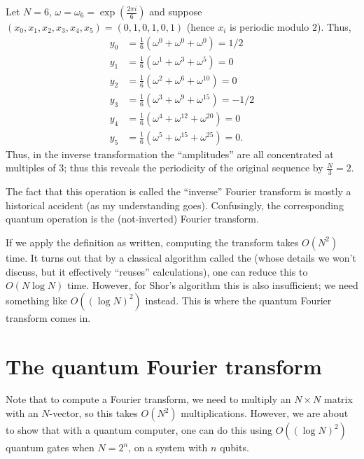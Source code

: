 \begin{example}
	Let $N = 6$, $\omega = \omega_6 = \exp(\frac{2\pi i}{6})$
	and suppose $(x_0,x_1,x_2,x_3,x_4,x_5)=(0,1,0,1,0,1)$
	(hence $x_i$ is periodic modulo $2$).
	Thus,
	\begin{align*}
		y_0 &= \tfrac16\left(\omega^0 + \omega^0+ \omega^0\right) = 1/2 \\
		y_1 &= \tfrac16\left(\omega^1 + \omega^3 + \omega^5\right) = 0 \\
		y_2 &= \tfrac16\left( \omega^2 + \omega^{6} + \omega^{10} \right) = 0 \\
		y_3 &= \tfrac16\left( \omega^3 + \omega^9 + \omega^{15} \right) = -1/2 \\
		y_4 &= \tfrac16\left( \omega^4 + \omega^{12} + \omega^{20} \right) = 0 \\
		y_5 &= \tfrac16\left( \omega^5 + \omega^{15} + \omega^{25} \right) = 0.
	\end{align*}
	Thus, in the inverse transformation the ``amplitudes''
	are all concentrated at multiples of $3$;
	thus this reveals the periodicity of the original
	sequence by $\frac N3 = 2$.
\end{example}
\begin{remark}
	The fact that this operation is called the ``inverse''
	Fourier transform is mostly a historical accident
	(as my understanding goes).
	Confusingly, the corresponding quantum operation is the
	(not-inverted) Fourier transform.
\end{remark}
If we apply the definition as written, computing the transform takes $O(N^2)$ time.
It turns out that by a classical algorithm called the 
(whose details we won't discuss, but it effectively ``reuses'' calculations),
one can reduce this to $O(N \log N)$ time.
However, for Shor's algorithm this is also insufficient;
we need something like $O\left( (\log N)^2 \right)$ instead.
This is where the quantum Fourier transform comes in.

\section{The quantum Fourier transform}
Note that to compute a Fourier transform, we need to multiply an $N \times N$ matrix
with an $N$-vector, so this takes $O(N^2)$ multiplications.
However, we are about to show that with a quantum computer,
one can do this using $O( (\log N)^2 )$ quantum gates when $N = 2^n$,
on a system with $n$ qubits.

